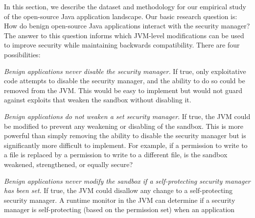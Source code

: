 \documentclass{sig-alternate-05-2015}
\begin{document}
In this section, we describe the dataset and methodology for our empirical study
of the open-source Java application landscape. 
%
Our basic research question is: How do benign open-source Java applications interact
with the security manager? The answer to this question informs which JVM-level
modifications can be used to improve security
while maintaining backwards compatibility.  %
There are four possibilities:
\begin{flushenum}	\setlength{\parskip}{0pt}
  \setlength{\parsep}{0pt}
  \setlength{\itemsep}{0pt}
\item \textit{Benign applications never disable the security manager.}  If true,
  only exploitative code attempts to disable the security manager, and the ability to
  do so could be removed from the JVM.  This would be easy to implement but would not guard against exploits
  that weaken the sandbox without disabling it.
\item \textit{Benign applications do not weaken a set security manager}.  If
  true, the JVM could be modified to prevent any weakening or disabling of the 
  sandbox.  This is more powerful than simply removing the
  ability to disable the security manager but is significantly more difficult to
  implement.
  For example, if a permission to write to a file is
  replaced by a permission to write to a different file, is the sandbox
  weakened, strengthened, or equally secure?
\item \textit{Benign applications never modify the sandbox if a self-protecting
    security manager has been set}. If true, the JVM could
  disallow any change to a self-protecting security manager. A runtime monitor in the JVM can
  determine if a security manager is self-protecting (based on the permission set) when an application

\end{flushenum}
\end{document}
